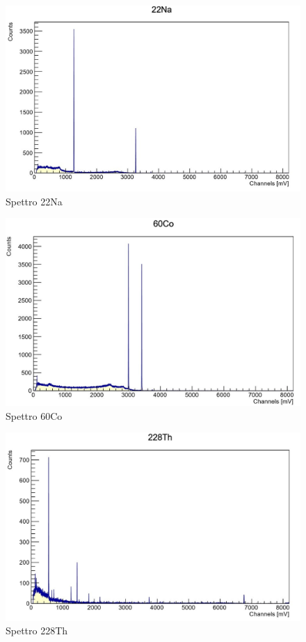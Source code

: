 \documentclass[a4paper,10pt]{article}
\begin{document}
\begin{figure}[h!]
    \centering
    \includegraphics[scale=0.45]{grafici/sodiocompleto}
    \caption{Spettro 22Na}
\end{figure}

\begin{figure}[h!]
    \centering
    \includegraphics[scale=0.45]{grafici/cobaltocompleto}
    \caption{Spettro 60Co}
\end{figure}

\begin{figure}[h!]
    \centering
    \includegraphics[scale=0.45]{grafici/toriocompleto}
    \caption{Spettro 228Th}
\end{figure}
\end{document}
